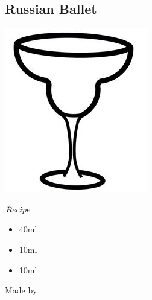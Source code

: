 \subsection{Russian Ballet}
\vspace{-7mm}
\hspace{44mm}
\includegraphics[scale=.05]{cocktail_glass_snow.jpg}
\vspace{2.5mm}
\begin{itembox}[l]{\boldmath $Recipe$}
\begin{itemize}
\setlength{\parskip}{0cm}
\setlength{\itemsep}{0cm}
\item \vodka 40ml
\item \cc 10ml
\item \lj 10ml
\end{itemize}
\vspace{-4mm}
Made by \shake
\end{itembox}
